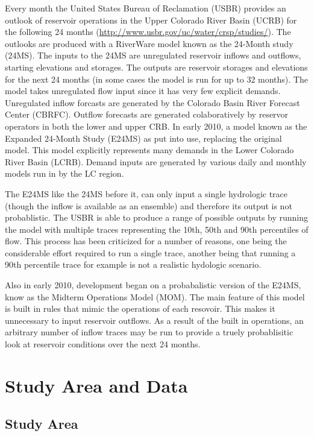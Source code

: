 \documentclass[final,5p,times,twocolumn,authoryear]{elsarticle}
\begin{document}
Every month the United States Bureau of Reclamation (USBR) provides an outlook of reservoir operations in the Upper Colorado River Basin (UCRB) for the following 24 months (\url{http://www.usbr.gov/uc/water/crsp/studies/}).  The outlooks are produced with a RiverWare model known as the 24-Month study (24MS).  The inputs to the 24MS are unregulated reservoir inflows and outflows, starting elevations and storages. The outputs are reservoir storages and elevations for the next 24 months (in some cases the model is run for up to 32 months).  The model takes unregulated flow input since it has very few explicit demands. Unregulated inflow forcasts are generated by the Colorado Basin River Forecast Center (CBRFC). Outflow forecasts are generated colaboratively by reservor operators in both the lower and upper CRB. In early 2010, a model known as the Expanded 24-Month Study (E24MS) as put into use, replacing the original model. This model explicitly represents many demands in the Lower Colorado River Basin (LCRB). Demand inputs are generated by various daily and monthly models run in by the LC region. 

The E24MS like the 24MS before it, can only input a single hydrologic trace (though the inflow is available as an ensemble) and therefore its output is not probablistic. The USBR is able to produce a range of possible outputs by running the model with multiple traces representing the 10th, 50th and 90th percentiles of flow.  This process has been criticized for a number of reasons, one being the considerable effort required to run a single trace, another being that running a 90th percentile trace for example is not a realistic hydologic scenario. 

Also in early 2010, development began on a probabalistic version of the E24MS, know as the Midterm  Operations Model (MOM).  The main feature of this model is built in rules that mimic the operations of each resovoir. This makes it unnecessary to input reservoir outflows.  As a result of the built in operations, an arbitrary number of inflow traces may be run to provide a truely probablisitic look at reservoir conditions over the next 24 months. 

\section{Study Area and Data}

\subsection{Study Area}
\end{document}
